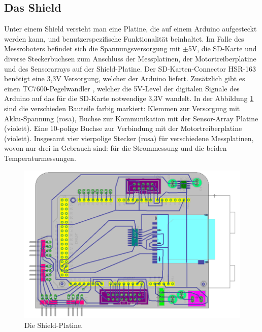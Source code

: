 \documentclass[a4paper,bibtotoc,oneside]{scrbook}
\begin{document}
\subsection{Das Shield}\thispagestyle{empty}
Unter einem Shield versteht man eine Platine, die auf einem Arduino aufgesteckt werden kann, und benutzerspezifische Funktionalität beinhaltet. Im Falle des Messroboters befindet sich die Spannungsversorgung mit $\pm$5V, die SD-Karte und diverse Steckerbuchsen zum Anschluss der Messplatinen, der Motortreiberplatine und des Sensorarrays auf der Shield-Platine. 
Der SD-Karten-Connector HSR-163 \cite{hsr} benötigt eine 3,3V Versorgung, welcher der Arduino liefert. 
Zusätzlich gibt es einen TC7600-Pegelwandler \cite{tc7660}, welcher die 5V-Level der digitalen Signale des Arduino auf das für die SD-Karte notwendige 3,3V wandelt.
In der Abbildung  \ref{shield} sind die verschieden Bauteile farbig markiert:
Klemmen zur Versorgung mit Akku-Spannung (rosa), Buchse zur Kommunikation mit der Sensor-Array Platine (violett). Eine 10-polige Buchse zur Verbindung mit der Motortreiberplatine (violett). Insgesamt vier vierpolige Stecker (rosa) für verschiedene Messplatinen, wovon nur drei in Gebrauch sind: für die Strommessung und die beiden Temperaturmessungen.

\begin{figure}[htbp]
\centering
\includegraphics[width=125mm]{img/shield.png}
\caption{Die Shield-Platine.}\label{shield}
\end{figure}
\end{document}
